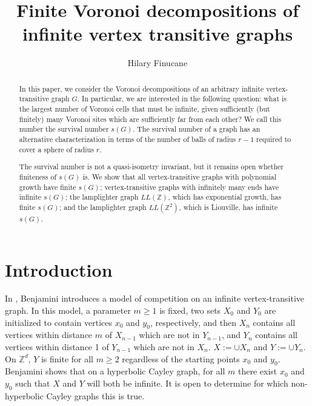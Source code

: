 \documentclass[11pt]{article}
\title{Finite Voronoi decompositions of infinite vertex transitive graphs}
\author{Hilary Finucane}
\date{}
\newcommand{\Z}{\mathbb{Z}}
\begin{document}
\maketitle

\begin{abstract}
In this paper, we consider the Voronoi decompositions of an arbitrary infinite vertex-transitive graph $G$. In particular, we are interested in the following question: what is the largest number of Voronoi cells that must be infinite, given sufficiently (but finitely) many Voronoi sites which are sufficiently far from each other? We call this number the survival number $s(G)$. The survival number of a graph has an alternative characterization in terms of the number of balls of radius $r-1$ required to cover a sphere of radius $r$.

The survival number is not a quasi-isometry invariant, but it remains open whether finiteness of $s(G)$ is. We show that all vertex-transitive graphs with polynomial growth have finite $s(G)$; vertex-transitive graphs with infinitely many ends have infinite $s(G)$; the lamplighter graph $LL(\Z)$, which has exponential growth, has finite $s(G)$; and the lamplighter graph $LL(\Z^2)$, which is Liouville, has infinite $s(G)$.

\end{abstract}

\section{Introduction}


In \cite{competition}, Benjamini introduces a model of competition on an infinite vertex-transitive graph. In this model, a parameter $m \geq 1$ is fixed, two sets $X_0$ and $Y_0$ are initialized to contain vertices $x_0$ and $y_0$, respectively, and then $X_n$ contains all vertices within distance $m$ of $X_{n-1}$ which are not in $Y_{n-1}$, and $Y_n$ contains all vertices within distance 1 of $Y_{n-1}$ which are not in $X_n$. $X := \cup X_n$ and $Y := \cup Y_n$. On $\Z^d$,  $Y$ is finite for all $m\geq 2$ regardless of the starting points $x_0$ and $y_0$. Benjamini shows that on a hyperbolic Cayley graph, for all $m$ there exist $x_0$ and $y_0$ such that $X$ and $Y$ will both be infinite. It is open to determine for which non-hyperbolic Cayley graphs this is true.
\end{document}
